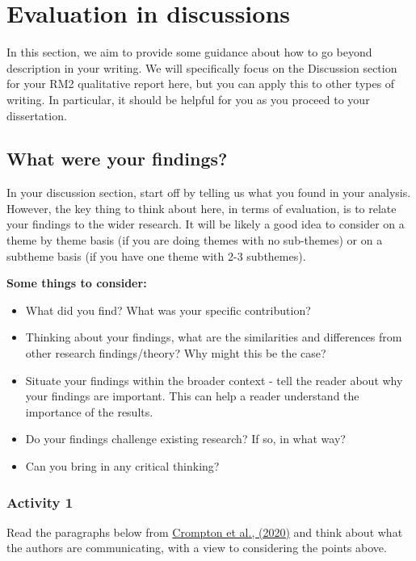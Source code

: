 \documentclass[
  english,
  letterpaper,
  DIV=11,
  numbers=noendperiod]{scrreprt}
\providecommand{\tightlist}{%
  \setlength{\itemsep}{0pt}\setlength{\parskip}{0pt}}
\begin{document}
\section{Evaluation in discussions}\label{eval_discussion}

In this section, we aim to provide some guidance about how to go beyond
description in your writing. We will specifically focus on the
Discussion section for your RM2 qualitative report here, but you can
apply this to other types of writing. In particular, it should be
helpful for you as you proceed to your dissertation.

\subsection{What were your findings?}\label{what-were-your-findings}

In your discussion section, start off by telling us what you found in
your analysis. However, the key thing to think about here, in terms of
evaluation, is to relate your findings to the wider research. It will be
likely a good idea to consider on a theme by theme basis (if you are
doing themes with no sub-themes) or on a subtheme basis (if you have one
theme with 2-3 subthemes).

\textbf{Some things to consider:}

\begin{itemize}
\tightlist
\item
  What did you find? What was your specific contribution?
\item
  Thinking about your findings, what are the similarities and
  differences from other research findings/theory? Why might this be the
  case?
\item
  Situate your findings within the broader context - tell the reader
  about why your findings are important. This can help a reader
  understand the importance of the results.
\item
  Do your findings challenge existing research? If so, in what way?
\item
  Can you bring in any critical thinking?
\end{itemize}

\subsubsection{Activity 1}\label{activity-1-2}

Read the paragraphs below from
\href{https://journals.sagepub.com/doi/full/10.1177/1362361320908976?fbclid=IwAR0tMsMbmeATwp5RpoKA-yqUr3QzyHuBSuy00uMAvlqZepaS4Pv_48VgQjA}{Crompton
et al., (2020)} and think about what the authors are communicating, with
a view to considering the points above.
\end{document}

